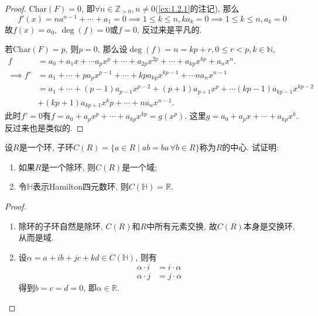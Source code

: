 \begin{proof}
    $\mathrm{Char}(F) = 0$, 即$\forall n \in \mathbb{Z}_{>0}, n \neq 0$(\ref{ex:1.2.1}的注记), 那么
    \[
        f'(x) = na^{n - 1} + \cdots + a_1 = 0 \implies 1 \leqslant k \leqslant n, ka_k = 0 \implies 1 \leqslant k \leqslant n, a_k = 0
    \]
    故$f(x) = a_0$, $\deg(f) = 0$或$f = 0$, 反过来是平凡的.

    若$\mathrm{Char}(F) = p$, 则$p = 0$, 那么设$\deg(f) = n = kp + r, 0 \leqslant r < p, k \in \mathbb{N}$,
    \[
    \begin{aligned}
        f &= a_0 + a_1x + \cdots a_px^p + \cdots + a_{2p}x^{2p} + \cdots + a_{kp}x^{kp} + a_nx^n.\\
        \implies f' &= a_1 + \cdots + pa_px^{p - 1} + \cdots + kpa_{kp}x^{kp - 1} + \cdots na_nx^{n - 1}\\
        &= a_1 + \cdots + (p - 1)a_{p - 1}x^{p - 2} + (p + 1)a_{p + 1}x^p + \cdots (kp - 1)a_{kp - 1}x^{kp - 2}\\
        &+ (kp + 1)a_{kp + 1}x^kp + \cdots + na_nx^{n - 1}.
    \end{aligned}
    \]
    此时$f' = 0$有$f = a_0 + a_px^p + \cdots + a_{kp}x^{kp} = g(x^p)$. 这里$g = a_0 + a_px + \cdots + a_{kp}x^k$. 反过来也是类似的.
\end{proof}

\begin{problem}\label{ex:2.1.11}
    设$R$是一个环, 子环$C(R) = \{a \in R \mid ab = ba\, \forall b \in R\}$称为$R$的中心. 试证明:
    \begin{enumerate}[(1)]
        \item 如果$R$是一个除环, 则$C(R)$是一个域;
        \item 令$\mathbb{H}$表示Hamilton四元数环, 则$C(\mathbb{H}) = \mathbb{R}$.
    \end{enumerate}
\end{problem}

\begin{proof}
    \begin{enumerate}[(1)]
        \item 除环的子环自然是除环, $C(R)$和$R$中所有元素交换, 故$C(R)$本身是交换环, 从而是域.
        \item 设$\alpha = a + ib + jc + kd \in C(\mathbb{H})$, 则有
        \[
        \begin{aligned}
            \alpha \cdot i &= i \cdot \alpha\\
            \alpha \cdot j &= j \cdot \alpha
        \end{aligned}
        \]
        得到$b = c = d = 0$, 即$\alpha \in \mathbb{R}$.
    \end{enumerate}
\end{proof}

